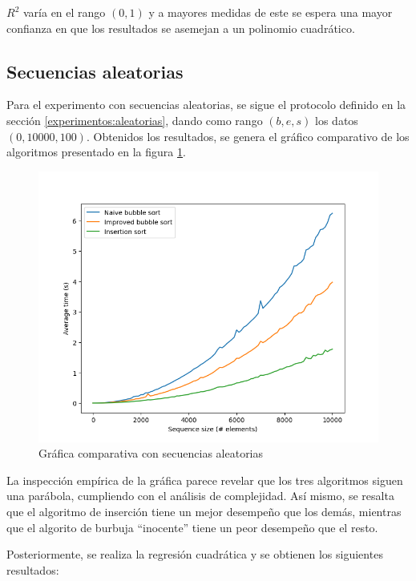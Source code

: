 \documentclass[letter]{article}
\begin{document}
$R^2$ varía en el rango $(0,1)$ y a mayores medidas de este se espera una mayor confianza en que los resultados se asemejan a un polinomio cuadrático.\par

\subsection{Secuencias aleatorias} \label{resultados:aleatorias}

Para el experimento con secuencias aleatorias, se sigue el protocolo definido en la sección \ref{experimentos:aleatorias}, dando como rango $(b,e,s)$ los datos $(0,10000,100)$. Obtenidos los resultados, se genera el gráfico comparativo de los algoritmos presentado en la figura \ref{fig:grafica:aleatorias}.

\begin{figure}[!htb]
\centering
\includegraphics[scale=0.56]{img/plot_random.png}
\vspace{-1em}
\caption{Gráfica comparativa con secuencias aleatorias}
\label{fig:grafica:aleatorias}
\end{figure}

La inspección empírica de la gráfica parece revelar que los tres algoritmos siguen una parábola, cumpliendo con el análisis de complejidad. Así mismo, se resalta que el algoritmo de inserción tiene un mejor desempeño que los demás, mientras que el algorito de burbuja ``inocente'' tiene un peor desempeño que el resto. \par

Posteriormente, se realiza la regresión cuadrática y se obtienen los siguientes resultados: \par
\end{document}
